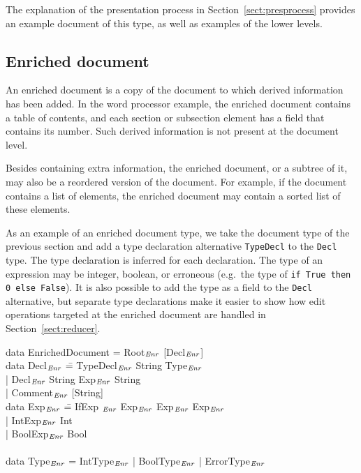 \documentclass{speauth}
\begin{document}
The explanation of the presentation process in Section~\ref{sect:presprocess} provides an example document of this type, as well as examples of the lower levels.

%																
\subsection{Enriched document} \label{sect:enrLevel}

An enriched document is a copy of the document to which derived information has been added. In the word processor example, the enriched document contains a table of contents, and each section or subsection element has a field that contains its number. Such derived information is not present at the document level.

Besides containing extra information, the enriched document, or a subtree of it, may also be a reordered version of the document. For example, if the document contains a list of elements, the enriched document may contain a sorted list of these elements.

As an example of an enriched document type, we take the document type of the previous section and add a type declaration alternative {\tt TypeDecl} to the {\tt Decl} type. The type declaration is inferred for each declaration. The type of an expression may be integer, boolean, or erroneous (e.g.\ the type of {\tt if True then 0 else False}). It is also possible to add the type as a field to the {\tt Decl} alternative, but separate type declarations make it easier to show how edit operations targeted at the enriched document are handled in Section~\ref{sect:reducer}.

\noindent
\ttfamily
\begin{tabbing}
data EnrichedDocument = Root$_{\mathit{Enr}}$ [Decl$_{\mathit{Enr}}$]\\
data Decl$_{\mathit{Enr}}$ \= = TypeDecl$_{\mathit{Enr}}$ String Type$_{\mathit{Enr}}$\\
                           \> | Decl$_{\mathit{Enr}}$ String Exp$_{\mathit{Enr}}$ String\\
                           \> | Comment$_{\mathit{Enr}}$ [String]\\
data Exp$_{\mathit{Enr}}$ \= =  IfExp $_{\mathit{Enr}}$ Exp$_{\mathit{Enr}}$ Exp$_{\mathit{Enr}}$ Exp$_{\mathit{Enr}}$\\
                 \> | IntExp$_{\mathit{Enr}}$ Int\\
                 \> | BoolExp$_{\mathit{Enr}}$ Bool\\
\\
data Type$_{\mathit{Enr}}$ = IntType$_{\mathit{Enr}}$ | BoolType$_{\mathit{Enr}}$ | ErrorType$_{\mathit{Enr}}$
\end{tabbing}
\rmfamily
\end{document}
